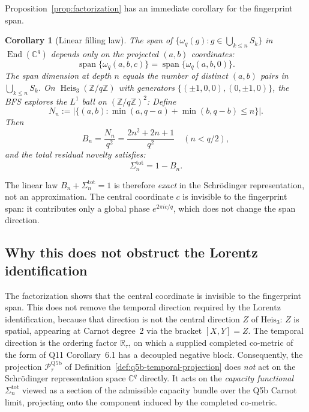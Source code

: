 \documentclass[11pt]{article}
\newtheorem{corollary}{Corollary}
\begin{document}
    Proposition~\ref{prop:factorization} has an immediate corollary for the fingerprint span.

    \begin{corollary}[Linear filling law]
      \label{cor:linear}
      The span of $\{\omega_q(g) : g \in \bigcup_{k \leq n} S_k\}$ in
      $\operatorname{End}(\mathbb{C}^q)$ depends only on the projected $(a,b)$ coordinates:
      \[
        \operatorname{span}\{\omega_q(a,b,c)\}
        =
        \operatorname{span}\{\omega_q(a,b,0)\}.
      \]
      The span dimension at depth $n$ equals the number of distinct $(a,b)$ pairs in
      $\bigcup_{k \leq n} S_k$.
      On $\operatorname{Heis}_3(\mathbb{Z}/q\mathbb{Z})$ with generators
      $\{(\pm1,0,0),(0,\pm1,0)\}$, the BFS explores the $L^1$ ball on
      $(\mathbb{Z}/q\mathbb{Z})^2$:
      Define
      \[
        N_n
        :=
        |\{(a,b) : \min(a,q-a)+\min(b,q-b) \leq n\}|.
      \]
      Then
      \[
        B_n=\frac{N_n}{q^2}
        =\frac{2n^2+2n+1}{q^2}
        \quad (n < q/2),
      \]
      and the total residual novelty satisfies:
      \[
        \Sigma_n^{\mathrm{tot}} = 1 - B_n.
      \]
    \end{corollary}

    The linear law $B_n + \Sigma_n^{\mathrm{tot}} = 1$ is therefore \emph{exact} in the
    Schr\"odinger representation, not an approximation.
    The central coordinate $c$ is invisible to the fingerprint span: it contributes only
    a global phase $e^{2\pi ic/q}$, which does not change the span direction.

  \subsection{Why this does not obstruct the Lorentz identification}

    The factorization shows that the central coordinate is invisible to the fingerprint span.
    This does not remove the temporal direction required by the Lorentz identification, because that direction is
    not the central direction $Z$ of $\mathrm{Heis}_3$: $Z$ is spatial, appearing at Carnot degree~2 via the bracket
    $[X,Y] = Z$.
    The temporal direction is the ordering factor $\mathbb{R}_\tau$, on which a supplied completed co-metric of the
    form of Q11 Corollary~6.1 has a decoupled negative block.
    Consequently, the projection $\mathcal{P}_\tau^{\mathrm{Q5b}}$ of
    Definition~\ref{def:q5b-temporal-projection} does \emph{not} act on the
    Schr\"odinger representation space $\mathbb{C}^q$ directly.
    It acts on the \emph{capacity functional} $\Sigma_n^{\mathrm{tot}}$ viewed as a
    section of the admissible capacity bundle over the Q5b Carnot limit, projecting
    onto the component induced by the completed co-metric.
\end{document}
